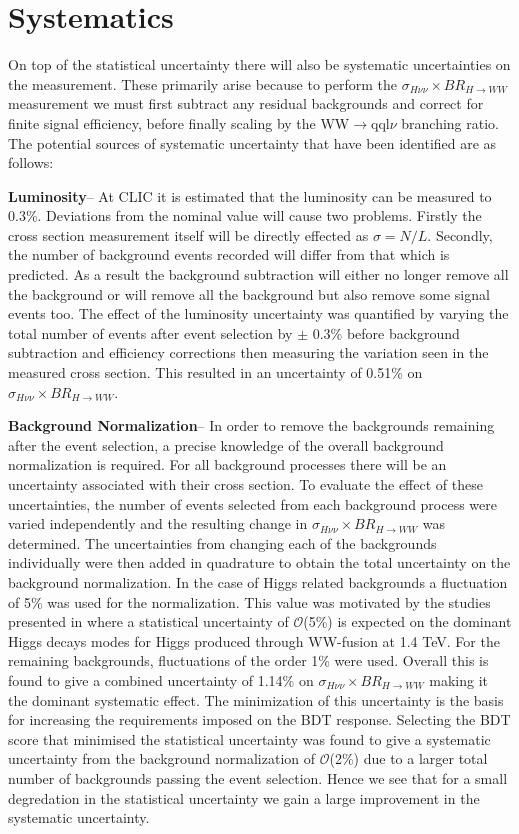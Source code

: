 \section{Systematics}
\label{higgsSystematics}
On top of the statistical uncertainty there will also be systematic uncertainties on the measurement. These primarily arise because to perform the $\sigma_{H\nu\nu}\times BR_{H\rightarrow WW}$ measurement we must first subtract any residual backgrounds and correct for finite signal efficiency, before finally scaling by the WW$\rightarrow$qql$\nu$ branching ratio. The potential sources of systematic uncertainty that have been identified are as follows:

\textbf{Luminosity}-- At \ac{CLIC} it is estimated that the luminosity can be measured to 0.3\%. Deviations from the nominal value will cause two problems. Firstly the cross section measurement itself will be directly effected as $\sigma=N/L$. Secondly, the number of background events recorded will differ from that which is predicted. As a result the background subtraction will either no longer remove all the background or will remove all the background but also remove some signal events too. The effect of the luminosity uncertainty was quantified by varying the total number of events after event selection by $\pm$ 0.3\% before background subtraction and efficiency corrections then measuring the variation seen in the measured cross section. This resulted in an uncertainty of 0.51\% on $\sigma_{H\nu\nu}\times BR_{H\rightarrow WW}$.

\textbf{Background Normalization}-- In order to remove the backgrounds remaining after the event selection, a precise knowledge of the overall background normalization is required. For all background processes there will be an uncertainty associated with their cross section. To evaluate the effect of these uncertainties, the number of events selected from each background process were varied independently and the resulting change in $\sigma_{H\nu\nu}\times BR_{H\rightarrow WW}$ was determined. The uncertainties from changing each of the backgrounds individually were then added in quadrature to obtain the total uncertainty on the background normalization. In the case of Higgs related backgrounds a fluctuation of 5\% was used for the normalization. This value was motivated by the studies presented in  \cite{Abramowicz:2016zbo} where a statistical uncertainty of $\mathcal{O}$(5\%) is expected on the dominant Higgs decays modes for Higgs produced through WW-fusion at 1.4 TeV. For the remaining backgrounds, fluctuations of the order 1\% were used. Overall this is found to give a combined uncertainty of 1.14\% on $\sigma_{H\nu\nu}\times BR_{H\rightarrow WW}$ making it the dominant systematic effect. The minimization of this uncertainty is the basis for increasing the requirements imposed on the BDT response. Selecting the BDT score that minimised the statistical uncertainty was found to give a systematic uncertainty from the background normalization of $\mathcal{O}$(2\%) due to a larger total number of backgrounds passing the event selection. Hence we see that for a small degredation in the statistical uncertainty we gain a large improvement in the systematic uncertainty.

